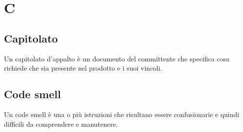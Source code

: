 \section{C}
	\subsection{Capitolato}
		Un capitolato d'appalto è un documento del committente che specifica cosa richiede che sia presente nel prodotto e i suoi vincoli.
	\subsection{Code smell} 
		Un code smell è una o più istruzioni che risultano essere confusionarie e quindi difficili da comprendere e manutenere.
		
\newpage
